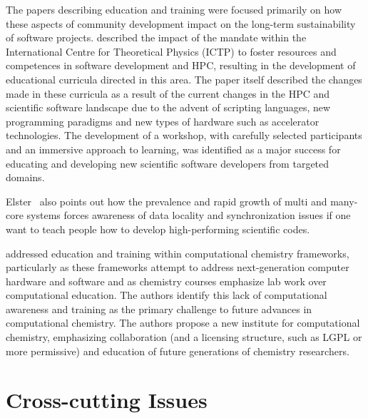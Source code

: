 \documentclass[11pt, oneside]{amsart}
\newcommand{\todo}[1]{{\color{blue}$\blacksquare$~\textsf{[TODO: #1]}}}
\newcommand{\note}[1]{ {\textcolor{red}    { #1 }}}
\begin{document}
The papers describing education and training were focused primarily on
how these aspects of community development impact on the long-term
sustainability of software projects.  \cite{Girotto_WSSSPE} described
the impact of the mandate within the International Centre for
Theoretical Physics (ICTP) to foster resources and competences in
software development and HPC, resulting in the development of
educational curricula directed in this area.  The paper itself
described the changes made in these curricula as a result of the
current changes in the HPC and scientific software landscape due to
the advent of scripting languages, new programming paradigms and new
types of hardware such as accelerator technologies.  The development
of a workshop, with carefully selected participants and an immersive
approach to learning, was identified as a major success for educating
and developing new scientific software developers from targeted
domains. 

Elster~\cite{Elster_WSSSPE} also points out how the 
prevalence and rapid growth of multi and many-core systems forces 
awareness of data locality and synchronization issues
if one want to teach people how to develop high-performing scientific codes.


\cite{Crawford_WSSSPE} addressed education and training within
computational chemistry frameworks, particularly as these frameworks
attempt to address next-generation computer hardware and software and
as chemistry courses emphasize lab work over computational education.
The authors identify this lack of computational awareness and training
as the primary challenge to future advances in computational
chemistry.  The authors propose a new institute for computational
chemistry, emphasizing collaboration (and a licensing structure, such
as LGPL or more permissive) and education of future generations of
chemistry researchers.

%
%
%

\section{Cross-cutting Issues} \label{sec:cross-cutting}
\end{document}
